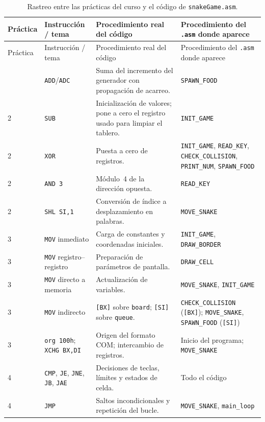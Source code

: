 \documentclass[10pt]{article}
\begin{document}
\begin{longtable}{@{}p{1.6cm}p{3.2cm}p{4.6cm}p{3.6cm}@{}}
\caption{Rastreo entre las prácticas del curso y el código de \texttt{snakeGame.asm}.}\label{tab:rastreo}\\
\toprule
Práctica & Instrucción / tema & Procedimiento real del código & Procedimiento del \texttt{.asm} donde aparece \\
\midrule
\endfirsthead
\toprule
Práctica & Instrucción / tema & Procedimiento real del código & Procedimiento del \texttt{.asm} donde aparece \\
\midrule
\endhead
\bottomrule
\endfoot
2 & \texttt{ADD}/\texttt{ADC} & Suma del incremento del generador con propagación de acarreo. & \texttt{SPAWN\_FOOD} \\
2 & \texttt{SUB} & Inicialización de valores; pone a cero el registro usado para limpiar el tablero. & \texttt{INIT\_GAME} \\
2 & \texttt{XOR} & Puesta a cero de registros. & \texttt{INIT\_GAME}, \texttt{READ\_KEY}, \texttt{CHECK\_COLLISION}, \texttt{PRINT\_NUM}, \texttt{SPAWN\_FOOD} \\
2 & \texttt{AND 3} & Módulo~4 de la dirección opuesta. & \texttt{READ\_KEY} \\
2 & \texttt{SHL SI,1} & Conversión de índice a desplazamiento en palabras. & \texttt{MOVE\_SNAKE} \\
3 & \texttt{MOV} inmediato & Carga de constantes y coordenadas iniciales. & \texttt{INIT\_GAME}, \texttt{DRAW\_BORDER} \\
3 & \texttt{MOV} registro--registro & Preparación de parámetros de pantalla. & \texttt{DRAW\_CELL} \\
3 & \texttt{MOV} directo a memoria & Actualización de variables. & \texttt{MOVE\_SNAKE}, \texttt{INIT\_GAME} \\
3 & \texttt{MOV} indirecto & \texttt{[BX]} sobre \texttt{board}; \texttt{[SI]} sobre \texttt{queue}. & \texttt{CHECK\_COLLISION} (\texttt{[BX]}); \texttt{MOVE\_SNAKE}, \texttt{SPAWN\_FOOD} (\texttt{[SI]}) \\
3 & \texttt{org 100h}; \texttt{XCHG BX,DI} & Origen del formato COM; intercambio de registros. & Inicio del programa; \texttt{MOVE\_SNAKE} \\
4 & \texttt{CMP}, \texttt{JE}, \texttt{JNE}, \texttt{JB}, \texttt{JAE} & Decisiones de teclas, límites y estados de celda. & Todo el código \\
4 & \texttt{JMP} & Saltos incondicionales y repetición del bucle. & \texttt{MOVE\_SNAKE}, \texttt{main\_loop} \\

\end{longtable}
\end{document}
